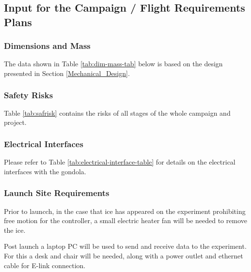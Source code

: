 \subsection{Input for the Campaign / Flight Requirements Plans}


\subsubsection{Dimensions and Mass}
\label{sec:dim-mass}

The data shown in Table \ref{tab:dim-mass-tab} below is based on the design presented in Section \ref{Mechanical_Design}. %



\subsubsection{Safety Risks}
Table \ref{tab:safrisk} contains the risks of all stages of the whole campaign and project.


\subsubsection{Electrical Interfaces}

Please refer to Table \ref{tab:electrical-interface-table} for details on the electrical interfaces with the gondola.



\subsubsection{Launch Site Requirements}
Prior to launcch, in the case that ice has appeared on the experiment prohibiting free motion for the controller, a small electric heater fan will be needed to remove the ice.

Post launch a laptop PC will be used to send and receive data to the experiment. For this a desk and chair will be needed, along with a power outlet and ethernet cable for E-link connection.


